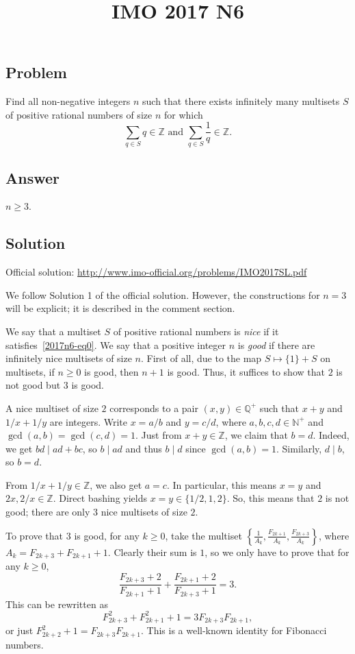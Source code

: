 \documentclass{article}
\title{IMO 2017 N6}
\author{}
\date{}
\newcommand{\N}{\mathbb{N}}
\newcommand{\Q}{\mathbb{Q}}
\newcommand{\Z}{\mathbb{Z}}
\begin{document}
\maketitle

\subsection*{Problem}

Find all non-negative integers $n$ such that there exists infinitely many multisets $S$ of positive rational numbers of size $n$ for which
\[ \sum_{q \in S} q \in \Z \text{ and } \sum_{q \in S} \frac{1}{q} \in \Z. \tag{*}\label{2017n6-eq0} \]



\subsection*{Answer}

$n \geq 3$.



\subsection*{Solution}

Official solution: \url{http://www.imo-official.org/problems/IMO2017SL.pdf}

We follow Solution 1 of the official solution.
However, the constructions for $n = 3$ will be explicit; it is described in the comment section.

We say that a multiset $S$ of positive rational numbers is \emph{nice} if it satisfies~\eqref{2017n6-eq0}.
We say that a positive integer $n$ is \emph{good} if there are infinitely nice multisets of size $n$.
First of all, due to the map $S \mapsto \{1\} + S$ on multisets, if $n \geq 0$ is good, then $n + 1$ is good.
Thus, it suffices to show that $2$ is not good but $3$ is good.

A nice multiset of size $2$ corresponds to a pair $(x, y) \in \Q^+$ such that $x + y$ and $1/x + 1/y$ are integers.
Write $x = a/b$ and $y = c/d$, where $a, b, c, d \in \N^+$ and $\gcd(a, b) = \gcd(c, d) = 1$.
Just from $x + y \in \Z$, we claim that $b = d$.
Indeed, we get $bd \mid ad + bc$, so $b \mid ad$ and thus $b \mid d$ since $\gcd(a, b) = 1$.
Similarly, $d \mid b$, so $b = d$.

From $1/x + 1/y \in \Z$, we also get $a = c$.
In particular, this means $x = y$ and $2x, 2/x \in \Z$.
Direct bashing yields $x = y \in \{1/2, 1, 2\}$.
So, this means that $2$ is not good; there are only $3$ nice multisets of size $2$.

To prove that $3$ is good, for any $k \geq 0$, take the multiset $\left\{\frac{1}{A_k}, \frac{F_{2k + 1}}{A_k}, \frac{F_{2k + 3}}{A_k}\right\}$, where $A_k = F_{2k + 3} + F_{2k + 1} + 1$.
Clearly their sum is $1$, so we only have to prove that for any $k \geq 0$,
\[ \frac{F_{2k + 3} + 2}{F_{2k + 1} + 1} + \frac{F_{2k + 1} + 2}{F_{2k + 3} + 1} = 3. \]
This can be rewritten as
\[ F_{2k + 3}^2 + F_{2k + 1}^2 + 1 = 3 F_{2k + 3} F_{2k + 1}, \]
    or just $F_{2k + 2}^2 + 1 = F_{2k + 3} F_{2k + 1}$.
This is a well-known identity for Fibonacci numbers.
\end{document}
